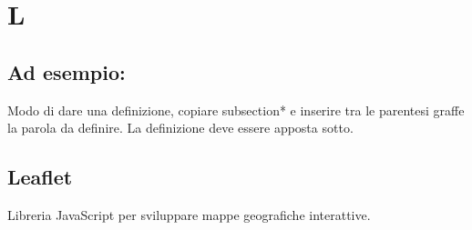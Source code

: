 \section*{L}
\markright{}
\subsection*{Ad esempio:}
Modo di dare una definizione, copiare subsection*{} e inserire tra le parentesi graffe la parola da definire. La definizione deve essere apposta sotto.
\subsection*{Leaflet}
Libreria JavaScript per sviluppare mappe geografiche interattive.
